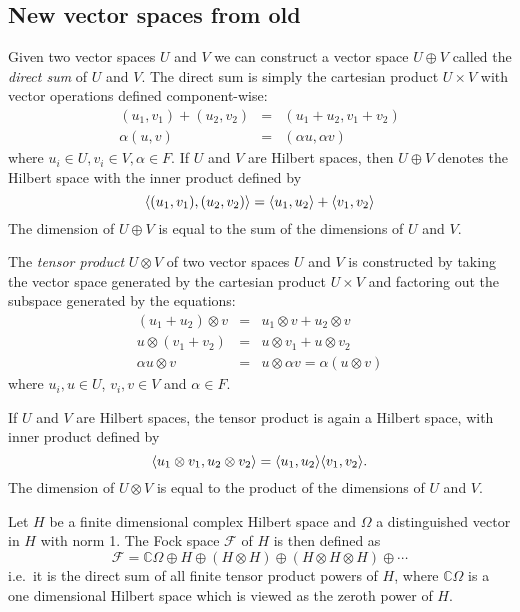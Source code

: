 \documentclass[12pt]{report}
\begin{document}
\subsection{New vector spaces from old}
\begin{defn}
Given two vector spaces $U$ and $V$ we can construct a vector space $U \oplus V$ called the \emph{direct sum} of $U$ and $V$. The direct sum is simply the cartesian product $U \times V$ with vector operations defined component-wise:
\begin{eqnarray*}
(u_1,v_1) + (u_2,v_2) & = & (u_1+u_2,v_1+v_2)\\
\alpha(u,v) & = & (\alpha u, \alpha v)
\end{eqnarray*}
where $u_i \in U, v_i \in V, \alpha \in F$. If $U$ and $V$ are Hilbert spaces, then $U \oplus V$ denotes the Hilbert space with the inner product defined by
$$\langle (u_1,v_1), (u_2,v_2) \rangle = \langle u_1, u_2 \rangle + \langle v_1, v_2 \rangle$$
The dimension of $U\oplus V$ is equal to the sum of the dimensions of $U$ and $V$.
\end{defn}
\begin{defn}

The \emph{tensor product} $U \otimes V$ of two vector spaces $U$ and $V$ is constructed by taking the vector space generated by the cartesian product $U \times V$ and factoring out the subspace generated by the equations:
\begin{eqnarray*}
(u_1 + u_2) \otimes v & = & u_1 \otimes v + u_2 \otimes v\\
u \otimes (v_1 + v_2) & = & u \otimes v_1 + u \otimes v_2\\
\alpha u\otimes v & =  &u \otimes \alpha v = \alpha(u \otimes v) 
\end{eqnarray*}
where $u_i,u \in U$, $v_i,v \in V$ and $\alpha \in F$.

If $U$ and $V$ are Hilbert spaces, the tensor product is again a Hilbert space, with inner product defined by
$$\langle u_1\otimes v_1, u_2 \otimes v_2 \rangle = \langle u_1, u_2 \rangle\langle v_1, v_2 \rangle.$$
The dimension of $U \otimes V$ is equal to the product of the dimensions of $U$ and $V$.
\end{defn}
\begin{defn}
Let $H$ be a finite dimensional complex Hilbert space and $\Omega$ a distinguished vector in $H$ with norm 1. The Fock space $\mathcal{F}$ of $H$ is then defined as
$$\mathcal{F} = \mathbb{C}\Omega \oplus H \oplus (H \otimes H) \oplus (H \otimes H \otimes H) \oplus \cdots$$
i.e.~it is the direct sum of all finite tensor product powers of $H$, where $\mathbb{C}\Omega$ is a one dimensional Hilbert space which is viewed as the zeroth power of $H$.
\end{defn}
\end{document}
